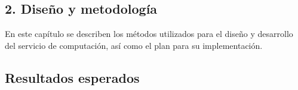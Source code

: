 \begin{doublespace}
\begin{tightcenter}
\section{2. Diseño y metodología}
\mylinespacing
\end{tightcenter}

\begin{multicols}{2}

    En este capítulo se describen los métodos utilizados para el diseño y desarrollo del servicio de computación, así como el plan para su implementación.

    \subsection{Resultados esperados}
\end{multicols}


\end{doublespace}
